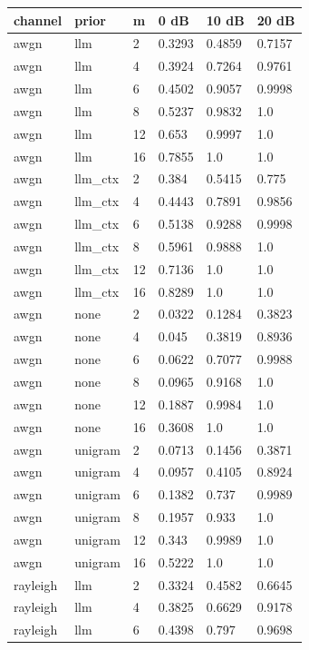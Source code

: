 \begin{tabular}{llllll}
\hline
channel & prior & m & 0 dB & 10 dB & 20 dB \\
\hline
awgn & llm & 2 & 0.3293 & 0.4859 & 0.7157 \\
awgn & llm & 4 & 0.3924 & 0.7264 & 0.9761 \\
awgn & llm & 6 & 0.4502 & 0.9057 & 0.9998 \\
awgn & llm & 8 & 0.5237 & 0.9832 & 1.0 \\
awgn & llm & 12 & 0.653 & 0.9997 & 1.0 \\
awgn & llm & 16 & 0.7855 & 1.0 & 1.0 \\
awgn & llm\_ctx & 2 & 0.384 & 0.5415 & 0.775 \\
awgn & llm\_ctx & 4 & 0.4443 & 0.7891 & 0.9856 \\
awgn & llm\_ctx & 6 & 0.5138 & 0.9288 & 0.9998 \\
awgn & llm\_ctx & 8 & 0.5961 & 0.9888 & 1.0 \\
awgn & llm\_ctx & 12 & 0.7136 & 1.0 & 1.0 \\
awgn & llm\_ctx & 16 & 0.8289 & 1.0 & 1.0 \\
awgn & none & 2 & 0.0322 & 0.1284 & 0.3823 \\
awgn & none & 4 & 0.045 & 0.3819 & 0.8936 \\
awgn & none & 6 & 0.0622 & 0.7077 & 0.9988 \\
awgn & none & 8 & 0.0965 & 0.9168 & 1.0 \\
awgn & none & 12 & 0.1887 & 0.9984 & 1.0 \\
awgn & none & 16 & 0.3608 & 1.0 & 1.0 \\
awgn & unigram & 2 & 0.0713 & 0.1456 & 0.3871 \\
awgn & unigram & 4 & 0.0957 & 0.4105 & 0.8924 \\
awgn & unigram & 6 & 0.1382 & 0.737 & 0.9989 \\
awgn & unigram & 8 & 0.1957 & 0.933 & 1.0 \\
awgn & unigram & 12 & 0.343 & 0.9989 & 1.0 \\
awgn & unigram & 16 & 0.5222 & 1.0 & 1.0 \\
rayleigh & llm & 2 & 0.3324 & 0.4582 & 0.6645 \\
rayleigh & llm & 4 & 0.3825 & 0.6629 & 0.9178 \\
rayleigh & llm & 6 & 0.4398 & 0.797 & 0.9698 \\

\end{tabular}
